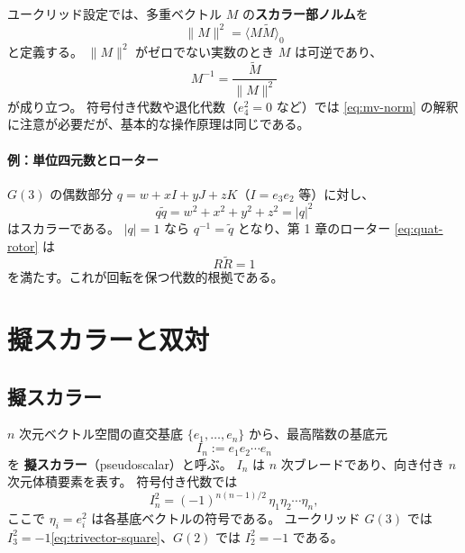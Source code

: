\documentclass[dvipdfmx,a4paper,oneside]{jsbook}
\numberwithin{equation}{chapter}
\begin{document}
ユークリッド設定では、多重ベクトル \(M\) の\textbf{スカラー部ノルム}を
\begin{equation}
  \|M\|^2 = \langle M\widetilde{M}\rangle_0
  \label{eq:mv-norm}
\end{equation}
と定義する。
\(\|M\|^2\) がゼロでない実数のとき \(M\) は可逆であり、
\begin{equation}
  M^{-1} = \frac{\widetilde{M}}{\|M\|^2}
  \label{eq:mv-inverse}
\end{equation}
が成り立つ。
符号付き代数や退化代数（\(e_4^2=0\) など）では \eqref{eq:mv-norm} の解釈に注意が必要だが、基本的な操作原理は同じである。

\paragraph{例：単位四元数とローター}
\(G(3)\) の偶数部分 \(q = w + xI + yJ + zK\)（\(I=e_3e_2\) 等）に対し、
\begin{equation}
  q\widetilde{q} = w^2 + x^2 + y^2 + z^2 = |q|^2
\end{equation}
はスカラーである。
\(|q|=1\) なら \(q^{-1} = \widetilde{q}\) となり、第 1 章のローター \eqref{eq:quat-rotor} は
\begin{equation}
  R\widetilde{R} = 1
  \label{eq:rotor-unitarity}
\end{equation}
を満たす。これが回転を保つ代数的根拠である。

\section{擬スカラーと双対}

\subsection{擬スカラー}

\(n\) 次元ベクトル空間の直交基底 \(\{e_1,\ldots,e_n\}\) から、最高階数の基底元
\begin{equation}
  I_n := e_1 e_2 \cdots e_n
  \label{eq:pseudoscalar-def}
\end{equation}
を \textbf{擬スカラー}（pseudoscalar）と呼ぶ。
\(I_n\) は \(n\) 次ブレードであり、向き付き \(n\) 次元体積要素を表す。
符号付き代数では
\begin{equation}
  I_n^2 = (-1)^{n(n-1)/2}\,\eta_{1}\eta_{2}\cdots\eta_{n},
  \label{eq:pseudo-square}
\end{equation}
ここで \(\eta_i = e_i^2\) は各基底ベクトルの符号である。
ユークリッド \(G(3)\) では \(I_3^2 = -1\)\eqref{eq:trivector-square}、\(G(2)\) では \(I_2^2 = -1\) である。
\end{document}
